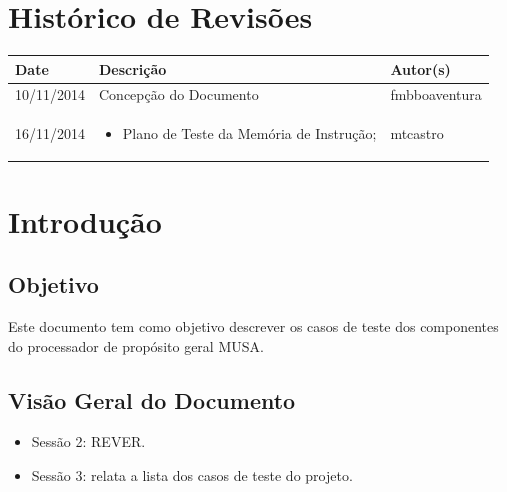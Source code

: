 \documentclass{article}
\begin{document}

\capa
\newpage

\section*{\center Histórico de Revisões}
  \vspace*{1cm}
  \begin{table}[ht]
    \centering
    \begin{tabular}[pos]{|m{2cm} | m{7.2cm} | m{3.8cm}|} 
      \hline
      \cellcolor[gray]{0.9}
      \textbf{Date} & \cellcolor[gray]{0.9}\textbf{Descrição} & \cellcolor[gray]{0.9}\textbf{Autor(s)}\\ \hline
      \hline
      \small 10/11/2014 & \small Concepção do Documento & \small fmbboaventura \\ \hline      
     \small 16/11/2014 &
      \begin{small}
        \begin{itemize}
          \item Plano de Teste da Memória de Instrução;
        \end{itemize}
      \end{small} & \small mtcastro \\ \hline
    \end{tabular}
  \end{table}

\newpage

\tableofcontents
\newpage

\section{Introdução}

  \subsection{Objetivo}
  Este documento tem como objetivo descrever os casos de teste dos componentes do processador de propósito geral MUSA.
  
  \subsection{Visão Geral do Documento}
  \begin{itemize}
    \item Sessão 2: REVER.
    \item Sessão 3: relata a lista dos casos de teste do projeto.
  \end{itemize}
  
\end{document}
